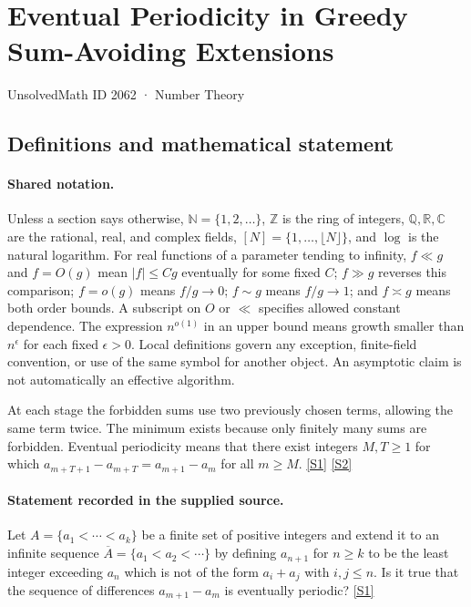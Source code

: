 \documentclass[11pt,a4paper]{article}
\newcommand{\N}{\mathbb{N}}
\newcommand{\Z}{\mathbb{Z}}
\newcommand{\Q}{\mathbb{Q}}
\newcommand{\R}{\mathbb{R}}
\newcommand{\C}{\mathbb{C}}
\newcommand{\sref}[2]{\hyperlink{source:#1:#2}{[S#2]}}
\begin{document}

\setcounter{section}{2061}

\section{Eventual Periodicity in Greedy Sum-Avoiding Extensions}\label{2062}

{\small\sffamily UnsolvedMath ID 2062 · Number Theory}

\subsection{Definitions and mathematical statement}

\paragraph{Shared notation.}Unless a section says otherwise, $\N=\{1,2,\ldots\}$,
$\Z$ is the ring of integers, $\Q,\R,\C$ are the rational, real, and complex
fields, $[N]=\{1,\ldots,\lfloor N\rfloor\}$, and $\log$ is the natural
logarithm. For real functions of a parameter tending to infinity,
$f\ll g$ and $f=O(g)$ mean $|f|\leq Cg$ eventually for some fixed $C$;
$f\gg g$ reverses this comparison; $f=o(g)$ means $f/g\to0$;
$f\sim g$ means $f/g\to1$; and $f\asymp g$ means both order bounds.
A subscript on $O$ or $\ll$ specifies allowed constant dependence.
The expression $n^{o(1)}$ in an upper bound means growth smaller than
$n^\epsilon$ for each fixed $\epsilon>0$. Local definitions govern any
exception, finite-field convention, or use of the same symbol for another
object. An asymptotic claim is not automatically an effective algorithm.



At each stage the forbidden sums use two previously chosen terms, allowing the same term twice. The minimum exists because only finitely many sums are forbidden. Eventual periodicity means that there exist integers $M,T\geq1$ for which $a_{m+T+1}-a_{m+T}=a_{m+1}-a_m$ for all $m\geq M$. \sref{2062}{1} \sref{2062}{2}

\paragraph{Statement recorded in the supplied source.}
Let $A=\{a_1<\cdots<a_k\}$ be a finite set of positive integers and extend it to an infinite sequence $\overline{A}=\{a_1<a_2<\cdots \}$ by defining $a_{n+1}$ for $n\geq k$ to be the least integer exceeding $a_n$ which is not of the form $a_i+a_j$ with $i,j\leq n$. Is it true that the sequence of differences $a_{m+1}-a_m$ is eventually periodic? \sref{2062}{1}
\end{document}
